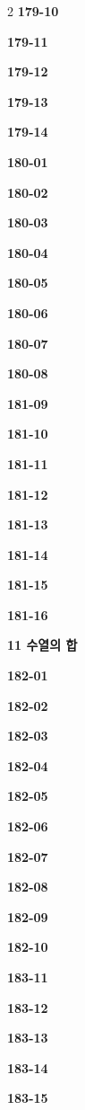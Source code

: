 \documentclass[10pt,a4paper]{article}
\begin{document}
\begin{multicols}{2}
\noindent\textbf{179-10}\ \par
\noindent\textbf{179-11}\ \par
\noindent\textbf{179-12}\ \par
\noindent\textbf{179-13}\ \par
\noindent\textbf{179-14}\ \par
\noindent\textbf{180-01}\ \par
\noindent\textbf{180-02}\ \par
\noindent\textbf{180-03}\ \par
\noindent\textbf{180-04}\ \par
\noindent\textbf{180-05}\ \par
\noindent\textbf{180-06}\ \par
\noindent\textbf{180-07}\ \par
\noindent\textbf{180-08}\ \par
\noindent\textbf{181-09}\ \par
\noindent\textbf{181-10}\ \par
\noindent\textbf{181-11}\ \par
\noindent\textbf{181-12}\ \par
\noindent\textbf{181-13}\ \par
\noindent\textbf{181-14}\ \par
\noindent\textbf{181-15}\ \par
\noindent\textbf{181-16}\ \par
\noindent\textbf{11 수열의 합}\par\smallskip
\noindent\textbf{182-01}\ \par
\noindent\textbf{182-02}\ \par
\noindent\textbf{182-03}\ \par
\noindent\textbf{182-04}\ \par
\noindent\textbf{182-05}\ \par
\noindent\textbf{182-06}\ \par
\noindent\textbf{182-07}\ \par
\noindent\textbf{182-08}\ \par
\noindent\textbf{182-09}\ \par
\noindent\textbf{182-10}\ \par
\noindent\textbf{183-11}\ \par
\noindent\textbf{183-12}\ \par
\noindent\textbf{183-13}\ \par
\noindent\textbf{183-14}\ \par
\noindent\textbf{183-15}\ \par

\end{multicols}
\end{document}
